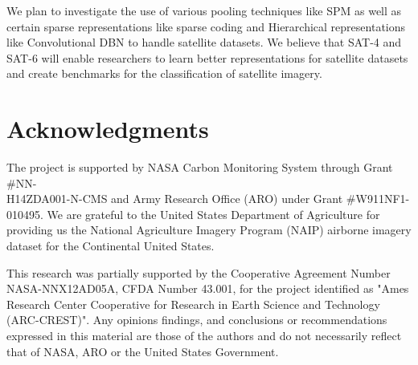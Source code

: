 \documentclass[11pt,a4paper]{article}
\begin{document}
We plan to investigate the use of various pooling techniques like SPM \cite{Lazebnik:2006} as well as certain sparse representations like sparse coding \cite{Lee07efficientsparse} and Hierarchical representations like Convolutional DBN \cite{Lee:2009:CDBN} to handle satellite datasets. We believe that SAT-4 and SAT-6 will enable researchers to learn better representations for satellite datasets and create benchmarks for the classification of satellite imagery. 







\section{Acknowledgments}
The project is supported by NASA Carbon Monitoring System through Grant \#NN-\\H14ZDA001-N-CMS and Army Research Office (ARO) under Grant \#W911NF1-\\010495. We are grateful to the United States Department of Agriculture for providing us the National Agriculture Imagery Program (NAIP) airborne imagery dataset for the Continental United States.

This research was partially supported by the Cooperative Agreement Number NASA-NNX12AD05A, CFDA Number 43.001, for the project identified as "Ames Research Center Cooperative for Research in Earth Science and Technology (ARC-CREST)". Any opinions findings, and conclusions or recommendations expressed in this material are those of the authors and do not necessarily reflect that of NASA, ARO or the United States Government. 









\end{document}
